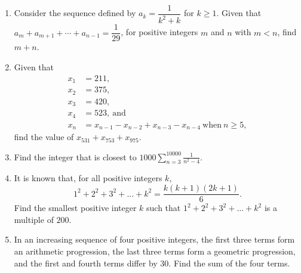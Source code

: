 \documentclass[12pt]{scrartcl}
\begin{document}
\begin{enumerate}
    \item Consider the sequence defined by $a_k =\dfrac{1}{k^2+k}$ for $k\geq 1$. Given that $a_m+a_{m+1}+\cdots+a_{n-1}=\dfrac{1}{29}$, for positive integers $m$ and $n$ with $m<n$, find $m+n$.

    \item Given that\begin{align*}x_{1}&=211,\\ x_{2}&=375,\\ x_{3}&=420,\\ x_{4}&=523,\ \text{and}\\ x_{n}&=x_{n-1}-x_{n-2}+x_{n-3}-x_{n-4}\ \text{when}\ n\geq5, \end{align*}find the value of $x_{531}+x_{753}+x_{975}$.

    \item Find the integer that is closest to $1000\sum_{n=3}^{10000}\frac1{n^2-4}$.

    \item It is known that, for all positive integers $k$, $$1^2+2^2+3^2+\ldots+k^{2}=\frac{k(k+1)(2k+1)}6.$$
    Find the smallest positive integer $k$ such that $1^2+2^2+3^2+\ldots+k^2$ is a multiple of $200$.

    \item In an increasing sequence of four positive integers, the first three terms form an arithmetic progression, the last three terms form a geometric progression, and the first and fourth terms differ by $30$. Find the sum of the four terms.
\end{enumerate}
\end{document}
